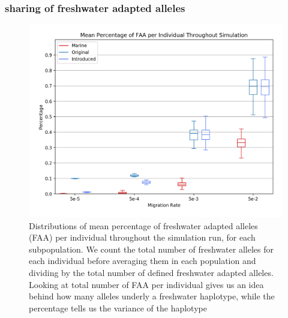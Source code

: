 \documentclass{article}
\begin{document}
 
\subsubsection*{sharing of freshwater adapted alleles}

\begin{figure}
	\begin{center}
  		\includegraphics[width=\linewidth]{matplotlibPlots/MPFAI.png}
  		\caption{Distributions of mean percentage of freshwater adapted alleles (FAA) per individual throughout the simulation run, for each subpopulation.
		We count the total number of freshwater alleles for each individual before averaging them in each population and dividing by the total number of defined
		freshwater adapted alleles.
		Looking at total number of FAA per individual gives us an idea behind how many alleles underly a freshwater haplotype, 
		while the percentage tells us the variance of the haplotype}
		\label{fig:MPFAI}
	\end{center}
\end{figure}
\end{document}
